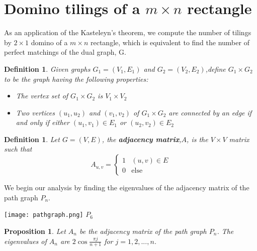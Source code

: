\documentclass[11pt]{article}
\newtheorem{proposition}[theorem]{Proposition}
\newtheorem{definition}[theorem]{Definition}
\begin{document}
\section{Domino tilings of a $m\times n$ rectangle}

As an application of the Kasteleyn's theorem, we compute the number of tilings by $2\times 1$ domino of a $m\times n$ rectangle, which is equivalent to find the number of perfect matchings of the dual graph, G.

\begin{definition}
Given graphs $G_1=(V_1,E_1)$ and $G_2=(V_2,E_2)$,define $G_1\times G_2$ to be the graph having the following properties:
\begin{itemize}
\item The vertex set of $G_1\times G_2$ is $V_1\times V_2$
\item Two vertices $(u_1,u_2)$ and $(v_1,v_2)$ of $G_1\times G_2$ are connected by an edge if and only if either $(u_1,v_1)\in E_1$ or $(u_2,v_2)\in E_2$
\end{itemize}
\end{definition}

\begin{definition}
Let $G=(V,E)$, the \textbf{adjacency matrix},$A$, is the $V\times V$ matrix such that
$$A_{u,v}= \begin{cases}1&\text{$(u,v)\in E$}\\ 0&\text{else} \end{cases}$$
\end{definition}

We begin our analysis by finding the eigenvalues of the adjacency matrix of the path graph $P_n$.
\begin{center}
\texttt{[image: pathgraph.png]}
$P_6$
\par\end{center}

\begin{proposition}
Let $A_n$ be the adjacency matrix of the path graph $P_n$. The eigenvalues of $A_n$ are $2\cos{\frac{\pi j}{n+1}}$ for $j=1,2,...,n$.
\end{proposition}
\end{document}

